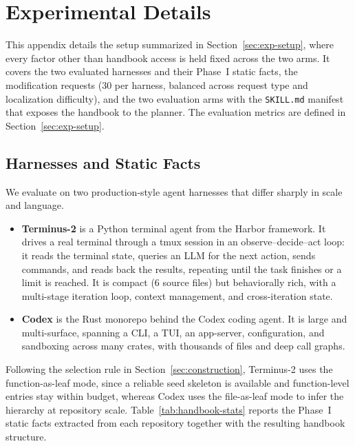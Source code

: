 \documentclass[]{ailab}
\newcommand{\hbsmall}{\textsf{function-as-leaf}}
\newcommand{\hblarge}{\textsf{file-as-leaf}}
\begin{document}
\section{Experimental Details}
\label{app:experimental-protocol}

This appendix details the setup summarized in Section~\ref{sec:exp-setup}, where
every factor other than handbook access is held fixed across the two arms. It
covers the two evaluated harnesses and their Phase~I static facts, the
modification requests ($30$ per harness, balanced across request type and
localization difficulty), and the two evaluation arms with the \texttt{SKILL.md}
manifest that exposes the handbook to the planner. The evaluation metrics are
defined in Section~\ref{sec:exp-setup}.

\subsection{Harnesses and Static Facts}

We evaluate on two production-style agent harnesses that differ sharply in scale
and language.

\begin{itemize}[leftmargin=1.4em,itemsep=2pt,topsep=2pt,parsep=0pt]
\item \textbf{Terminus-2} is a Python terminal agent from the Harbor framework. It
drives a real terminal through a tmux session in an observe--decide--act loop:
it reads the terminal state, queries an LLM for the next action, sends commands,
and reads back the results, repeating until the task finishes or a limit is
reached. It is compact (6 source files) but behaviorally rich, with a multi-stage
iteration loop, context management, and cross-iteration state.
\item \textbf{Codex} is the Rust monorepo behind the Codex coding agent. It is
large and multi-surface, spanning a CLI, a TUI, an app-server, configuration, and
sandboxing across many crates, with thousands of files and deep call graphs.
\end{itemize}

Following the selection rule in Section~\ref{sec:construction}, Terminus-2 uses the
\hbsmall{} mode, since a reliable seed skeleton is available and function-level
entries stay within budget, whereas Codex uses the \hblarge{} mode to infer the
hierarchy at repository scale. Table~\ref{tab:handbook-stats} reports the Phase~I
static facts extracted from each repository together with the resulting handbook
structure.
\end{document}
